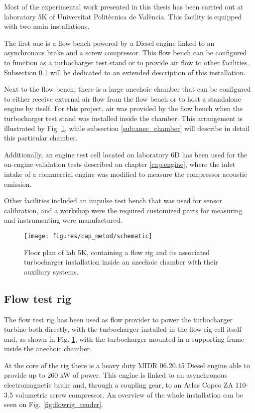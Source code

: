 Most of the experimental work presented in this thesis has been carried out at laboratory 5K of Universitat Politècnica de València. This facility is equipped with two main installations.

The first one is a flow bench powered by a Diesel engine linked to an asynchronous brake and a screw compressor. This flow bench can be configured to function as a turbocharger test stand or to provide air flow to other facilities. Subsection \ref{sub:flow_bench} will be dedicated to an extended description of this installation.

Next to the flow bench, there is a large anechoic chamber that can be configured to either receive external air flow from the flow bench or to host a standalone engine by itself. For this project, air was provided by the flow bench when the turbocharger test stand was installed inside the chamber. This arrangement is illustrated by Fig. \ref{fig:floorplan}, while subsection \ref{sub:anec_chamber} will describe in detail this particular chamber.

Additionally, an engine test cell located on laboratory 6D has been used for the on-engine validation tests described on chapter \ref{cap:engine}, where the inlet intake of a commercial engine was modified to measure the compressor acoustic emission.

Other facilities included an impulse test bench that was used for sensor calibration, and a workshop were the required customized parts for measuring and instrumenting were manufactured.

\begin{figure}[t!]
\centering
\texttt{[image: figures/cap\_metod/schematic]}
\caption{Floor plan of lab 5K, containing a flow rig and its associated turbocharger installation inside an anechoic chamber with their auxiliary systems.}
\label{fig:floorplan}
\end{figure}

\subsection{Flow test rig} \label{sub:flow_bench}

The flow test rig has been used as flow provider to power the turbocharger turbine both directly, with the turbocharger installed in the flow rig cell itself and, as shown in Fig. \ref{fig:floorplan}, with the turbocharger mounted in a supporting frame inside the anechoic chamber.

At the core of the rig there is a heavy duty MIDR 06.20.45 Diesel engine able to provide up to 260 kW of power. This engine is linked to an asynchronous electromagnetic brake and, through a coupling gear, to an Atlas Copco ZA 110-3.5 volumetric screw compressor. An overview of the whole installation can be seen on Fig. \ref{fig:flowrig_render}.

